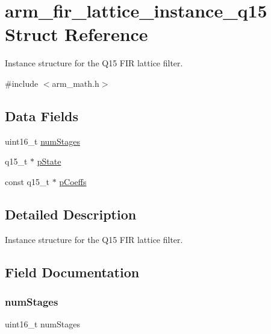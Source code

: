 \hypertarget{structarm__fir__lattice__instance__q15}{}\section{arm\+\_\+fir\+\_\+lattice\+\_\+instance\+\_\+q15 Struct Reference}
\label{structarm__fir__lattice__instance__q15}


Instance structure for the Q15 F\+IR lattice filter.  




{\ttfamily \#include $<$arm\+\_\+math.\+h$>$}

\subsection*{Data Fields}
\begin{DoxyCompactItemize}
\item 
uint16\+\_\+t \mbox{\hyperlink{structarm__fir__lattice__instance__q15_a4cceb90547b3e585d4c7aabaa8057212}{num\+Stages}}
\item 
q15\+\_\+t $\ast$ \mbox{\hyperlink{structarm__fir__lattice__instance__q15_ae29dfdb736374fcddaeaec4b7770170c}{p\+State}}
\item 
const q15\+\_\+t $\ast$ \mbox{\hyperlink{structarm__fir__lattice__instance__q15_ae85d417edcdce57e9a54f8c841580578}{p\+Coeffs}}
\end{DoxyCompactItemize}


\subsection{Detailed Description}
Instance structure for the Q15 F\+IR lattice filter. 

\subsection{Field Documentation}
\mbox{\label{structarm__fir__lattice__instance__q15_a4cceb90547b3e585d4c7aabaa8057212}} 
\subsubsection{\texorpdfstring{numStages}{numStages}}
{\footnotesize\ttfamily uint16\+\_\+t num\+Stages}

